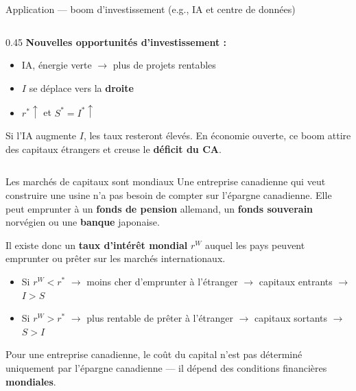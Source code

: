 \documentclass[aspectratio=169]{beamer}
\begin{document}
\begin{frame}[t]{Application --- boom d'investissement (e.g., IA et centre de données)}
\begin{columns}[T]
\begin{column}{0.45\textwidth}
         \textbf{Nouvelles opportunités d'investissement :}
         \vspace{0.15cm}
         \begin{itemize}
            \setlength\itemsep{0.1cm}
            \item IA, énergie verte $\to$ plus de projets rentables
            \item $I$ se déplace vers la \textbf{droite}
            \item $r^* \uparrow$ et $S^* = I^* \uparrow$
         \end{itemize}
         \vspace{0.1cm}
         \begin{bizimplication}
            \footnotesize
            Si l'IA augmente $I$, les taux resteront élevés. En économie ouverte, ce boom attire des capitaux étrangers et creuse le \textbf{déficit du CA}.
         \end{bizimplication}
      \end{column}
   \end{columns}
\end{frame}

\begin{frame}[t]{Les marchés de capitaux sont mondiaux}
   \small
   \vspace{0.1cm}
   Une entreprise canadienne qui veut construire une usine n'a pas besoin de compter sur l'épargne canadienne. Elle peut emprunter à un \textbf{fonds de pension} allemand, un \textbf{fonds souverain} norvégien ou une \textbf{banque} japonaise.
   \vspace{0.2cm}

   Il existe donc un \textbf{taux d'intérêt mondial} $r^W$ auquel les pays peuvent emprunter ou prêter sur les marchés internationaux.
   \vspace{0.15cm}
   \begin{itemize}
      \setlength\itemsep{0.15cm}
      \item Si $r^W < r^*$ $\to$ moins cher d'emprunter à l'étranger $\to$ capitaux entrants $\to$ $I > S$
      \item Si $r^W > r^*$ $\to$ plus rentable de prêter à l'étranger $\to$ capitaux sortants $\to$ $S > I$
   \end{itemize}
   \vspace{0.15cm}
   \begin{bizimplication}
      \footnotesize
      Pour une entreprise canadienne, le coût du capital n'est pas déterminé uniquement par l'épargne canadienne --- il dépend des conditions financières \textbf{mondiales}.
   \end{bizimplication}
\end{frame}
\end{document}
